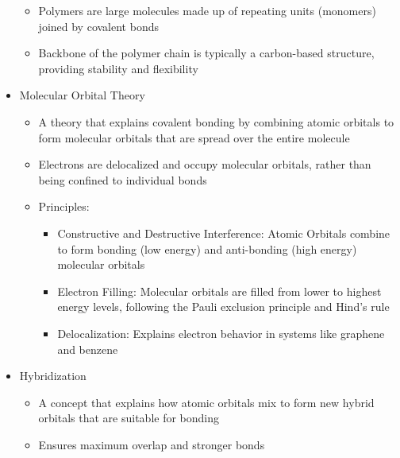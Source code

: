 \begin{itemize}
\begin{itemize}
      \item Polymers are large molecules made up of repeating units (monomers) joined by covalent bonds

      \item Backbone of the polymer chain is typically a carbon-based structure, providing stability and flexibility

    \end{itemize}

  \item Molecular Orbital Theory

    \begin{itemize}

      \item A theory that explains covalent bonding by combining atomic orbitals to form molecular orbitals that are spread over the entire molecule

      \item Electrons are delocalized and occupy molecular orbitals, rather than being confined to individual bonds

      \item Principles:

        \begin{itemize}

          \item Constructive and Destructive Interference: Atomic Orbitals combine to form bonding (low energy) and anti-bonding (high energy) molecular orbitals

          \item Electron Filling: Molecular orbitals are filled from lower to highest energy levels, following the Pauli exclusion principle and Hind's rule

          \item Delocalization: Explains electron behavior in systems like graphene and benzene

        \end{itemize}

    \end{itemize}

  \item Hybridization

    \begin{itemize}

      \item A concept that explains how atomic orbitals mix to form new hybrid orbitals that are suitable for bonding

      \item Ensures maximum overlap and stronger bonds

    \end{itemize}

\end{itemize}



